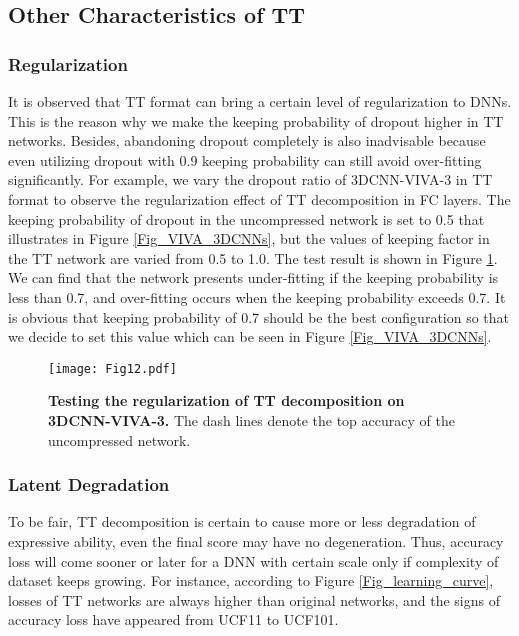 \documentclass[a4paper,fleqn]{cas-dc}
\begin{document}
\subsection{Other Characteristics of TT}

\subsubsection{Regularization}\quad

It is observed that TT format can bring a certain level of regularization to DNNs. This is the reason why we make the keeping probability of dropout higher in TT networks. Besides, abandoning dropout completely is also inadvisable because even utilizing dropout with 0.9 keeping probability can still avoid over-fitting significantly. For example, we vary the dropout ratio of 3DCNN-VIVA-3 in TT format to observe the regularization effect of TT decomposition in FC layers. The keeping probability of dropout in the uncompressed network is set to 0.5 that illustrates in Figure \ref{Fig_VIVA_3DCNNs}, but the values of keeping factor in the TT network are varied from 0.5 to 1.0. The test result is shown in Figure \ref{Fig_regularity}. We can find that the network presents under-fitting if the keeping probability is less than 0.7, and over-fitting occurs when the keeping probability exceeds 0.7. It is obvious that keeping probability of 0.7 should be the best configuration so that we decide to set this value which can be seen in Figure \ref{Fig_VIVA_3DCNNs}. 

\begin{figure}
\centering
\texttt{[image: Fig12.pdf]}
\caption{\textbf{Testing the regularization of TT decomposition on 3DCNN-VIVA-3.} The dash lines denote the top accuracy of the uncompressed network.}
\label{Fig_regularity}
\end{figure}

\subsubsection{Latent Degradation}\quad

To be fair, TT decomposition is certain to cause more or less degradation of expressive ability, even the final score may have no degeneration. Thus, accuracy loss will come sooner or later for a DNN with certain scale only if complexity of dataset keeps growing. For instance, according to Figure \ref{Fig_learning_curve}, losses of TT networks are always higher than original networks, and the signs of accuracy loss have appeared from UCF11 to UCF101.
\end{document}
